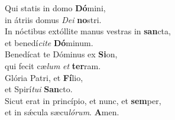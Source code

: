 \evenverse Qui statis in domo \textbf{Dó}mini,~\*\\
\evenverse in átriis domus \textit{De}\textit{i} \textbf{no}stri.\\
\oddverse In nóctibus extóllite manus vestras in \textbf{san}cta,~\*\\
\oddverse et benedí\textit{ci}\textit{te} \textbf{Dó}minum.\\
\evenverse Benedícat te Dóminus ex \textbf{Si}on,~\*\\
\evenverse qui fecit cæ\textit{lum} \textit{et} \textbf{ter}ram.\\
\oddverse Glória Patri, et \textbf{Fí}lio,~\*\\
\oddverse et Spirí\textit{tu}\textit{i} \textbf{San}cto.\\
\evenverse Sicut erat in princípio, et nunc, et \textbf{sem}per,~\*\\
\evenverse et in sǽcula sæcu\textit{ló}\textit{rum}. \textbf{A}men.\\
